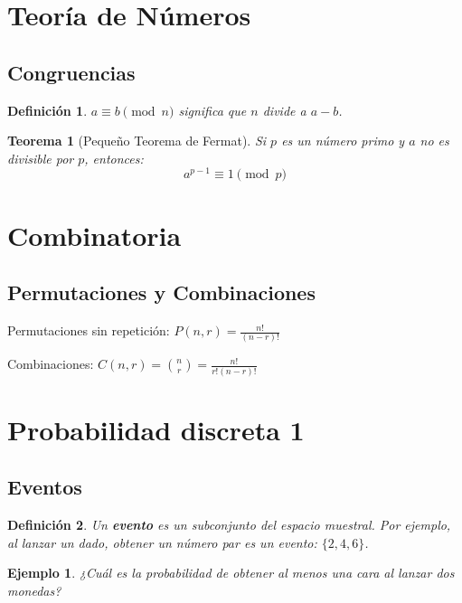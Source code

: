 \documentclass[11pt]{article}
\newtheorem{definition}{Definición}[section]
\newtheorem{theorem}{Teorema}[section]
\newtheorem{example}{Ejemplo}[section]
\begin{document}
\section{Teoría de Números}
\subsection{Congruencias}
\begin{definition}
$a \equiv b \pmod{n}$ significa que $n$ divide a $a - b$.
\end{definition}

\begin{theorem}[Pequeño Teorema de Fermat]
Si $p$ es un número primo y $a$ no es divisible por $p$, entonces:
\[
a^{p-1} \equiv 1 \pmod{p}
\]
\end{theorem}

\section{Combinatoria}
\subsection{Permutaciones y Combinaciones}
\begin{keyformula}
Permutaciones sin repetición: $P(n, r) = \frac{n!}{(n - r)!}$
\end{keyformula}

\begin{keyformula}
Combinaciones: $C(n, r) = \binom{n}{r} = \frac{n!}{r!(n - r)!}$
\end{keyformula}

\section{Probabilidad discreta 1}
\subsection{Eventos}
\begin{definition}
Un \textbf{evento} es un subconjunto del espacio muestral. Por ejemplo, al lanzar un dado, obtener un número par es un evento: $\{2, 4, 6\}$.
\end{definition}

\begin{example}
¿Cuál es la probabilidad de obtener al menos una cara al lanzar dos monedas?
\end{example}
\end{document}
